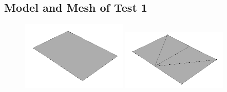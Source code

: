 \documentclass[a4paper, 12pt]{article}
\begin{document}
\subsection{Model and Mesh of Test 1} \label{subsec:test1Img}
\begin{figure}[H]
  \centering
  \subfigure
    { \includegraphics[width=0.45\textwidth, height=0.45\textwidth]
      {test1_smd}}
  \subfigure
    { \includegraphics[width=0.45\textwidth, height=0.45\textwidth]
      {test1_sms}}
\end{figure}
\end{document}
